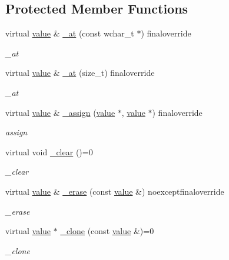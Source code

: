 \subsection*{Protected Member Functions}
\begin{DoxyCompactItemize}
\item 
virtual \hyperlink{classformat_1_1value_aa6b85823936bf7b8ab78d3f8d443c00d}{value} \& \hyperlink{classformat_1_1leaf_aa92aad1668dce02132ca0920b8803f1f}{\+\_\+at} (const wchar\+\_\+t $\ast$) finaloverride
\begin{DoxyCompactList}\small\item\em \+\_\+at \end{DoxyCompactList}\item 
virtual \hyperlink{classformat_1_1value_aa6b85823936bf7b8ab78d3f8d443c00d}{value} \& \hyperlink{classformat_1_1leaf_a629bf52297b80f099b6477ff88761a2b}{\+\_\+at} (size\+\_\+t) finaloverride
\begin{DoxyCompactList}\small\item\em \+\_\+at \end{DoxyCompactList}\item 
virtual \hyperlink{classformat_1_1value_aa6b85823936bf7b8ab78d3f8d443c00d}{value} \& \hyperlink{classformat_1_1leaf_ab73b4db4d7aa9d7490bdfb90d31cdc71}{\+\_\+assign} (\hyperlink{classformat_1_1value_aa6b85823936bf7b8ab78d3f8d443c00d}{value} $\ast$, \hyperlink{classformat_1_1value_aa6b85823936bf7b8ab78d3f8d443c00d}{value} $\ast$) finaloverride
\begin{DoxyCompactList}\small\item\em assign \end{DoxyCompactList}\item 
virtual void \hyperlink{classformat_1_1leaf_a98449fdebba18260ac00319e3ad7298f}{\+\_\+clear} ()=0\hypertarget{classformat_1_1leaf_a98449fdebba18260ac00319e3ad7298f}{}\label{classformat_1_1leaf_a98449fdebba18260ac00319e3ad7298f}

\begin{DoxyCompactList}\small\item\em \+\_\+clear \end{DoxyCompactList}\item 
virtual \hyperlink{classformat_1_1value_aa6b85823936bf7b8ab78d3f8d443c00d}{value} \& \hyperlink{classformat_1_1leaf_a666ee6101e4b668aba5925f1c68e2508}{\+\_\+erase} (const \hyperlink{classformat_1_1value_aa6b85823936bf7b8ab78d3f8d443c00d}{value} \&) noexceptfinaloverride
\begin{DoxyCompactList}\small\item\em \+\_\+erase \end{DoxyCompactList}\item 
virtual \hyperlink{classformat_1_1value_aa6b85823936bf7b8ab78d3f8d443c00d}{value} $\ast$ \hyperlink{classformat_1_1leaf_a45f6e4e09027122e445ba3b8352aec14}{\+\_\+clone} (const \hyperlink{classformat_1_1value_aa6b85823936bf7b8ab78d3f8d443c00d}{value} \&)=0
\begin{DoxyCompactList}\small\item\em \+\_\+clone \end{DoxyCompactList}\end{DoxyCompactItemize}
